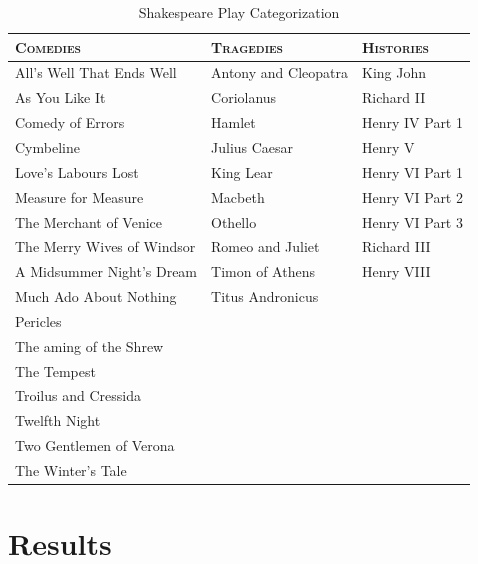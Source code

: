 \documentclass[12pt]{article} %
\begin{document}
\begin{center}
\begin{table}
\centering

\begin{tabular}{|l|l|l|}
  \hline
 \textsc{Comedies} & \textsc{Tragedies} & \textsc{Histories}\\
  \hline
  All's Well That Ends Well &  Antony and Cleopatra \hspace{8 mm} & King John \hspace{17 mm} \\
  \hline
  As You Like It & Coriolanus & Richard II\\
  \hline
  Comedy of Errors & Hamlet & Henry IV Part 1\\
  \hline
  Cymbeline & Julius Caesar & Henry V\\
  \hline
  Love's Labours Lost & King Lear & Henry VI Part 1\\
  \hline
  Measure for Measure & Macbeth & Henry VI Part 2\\
  \hline
  The Merchant of Venice & Othello & Henry VI Part 3\\
  \hline
  The Merry Wives of Windsor & Romeo and Juliet & Richard III \\
  \hline
  A Midsummer Night's Dream & Timon of Athens & Henry VIII \\
  \hline
  Much Ado About Nothing & Titus Andronicus & \\
  \hline
  Pericles &  & \\
  \hline
  The aming of the Shrew & & \\
  \hline
 The Tempest & & \\
  \hline
  Troilus and Cressida & & \\
  \hline
  Twelfth Night & & \\
  \hline
  Two Gentlemen of Verona & & \\
  \hline
  The Winter's Tale & & \\
  \hline
\end{tabular}
	\caption{Shakespeare Play Categorization}
\end{table}
\end{center}


	


\section{Results}
\end{document}
